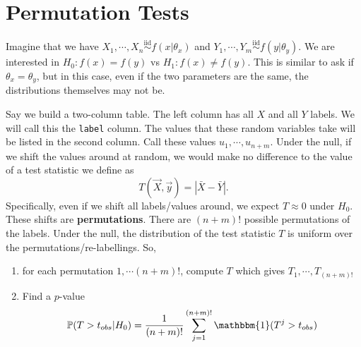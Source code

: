 \documentclass[titlepage, 12pt, leqno]{article}
\begin{document}
\pagebreak
\section{Permutation Tests}
Imagine that we have $X_{1}, \cdots ,X_{n} \overset{\mathrm{iid}}{\sim}f(x|
\theta_{x})$ and $Y_{1}, \cdots ,Y_{m} \overset{\mathrm{iid}}{\sim}f(y|
\theta_{y})$. We are interested in $H_{0}:f(x) = f(y)$ vs $H_{1}:f(x)\ne f(y)$.
This is similar to ask if $\theta_{x} = \theta_{y}$, but in this case, even if
the two parameters are the same, the distributions themselves may not be.

Say we build a two-column table. The left column has all $X$ and all $Y$
labels. We will call this the \texttt{label} column. The values that these
random variables take will be listed in the second column. Call these values
$u_{1}, \cdots ,u_{n+m}$. Under the null, if we shift the values around at 
random, we would make no difference to the value of a test statistic we define
as
\[
T(\vec X,\vec y) = |\bar X - \bar Y|.
\]
Specifically, even if we shift all labels/values around, we expect $T \approx0$
under $H_{0}$. These shifts are \textbf{permutations}. There are $(n+m)!$
possible permutations of the labels. Under the null, the distribution of the
test statistic $T$ is uniform over the permutations/re-labellings. So,
\begin{enumerate}
    \item for each permutation $1, \cdots (n+m)!$, compute $T$ which gives
        $T_{1}, \cdots ,T_{(n+m)!}$
    \item Find a $p$-value 
        \[
            \mathbb{P}(T>t_{obs}|H_{0}) = \frac{1}{(n+m)!}\sum_{j=1}^{(n+m)!}
            \mathbbm{1}(T^{j}>t_{obs})
        \]
\end{enumerate}
\end{document}
